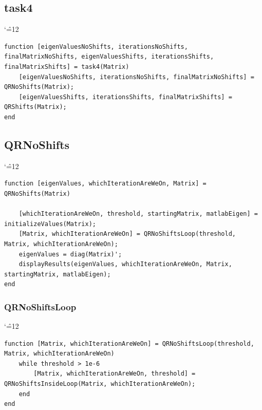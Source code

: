 \documentclass[12pt]{report}
\newenvironment{simplechar}{%
   \catcode`\^=12
}{}
\begin{document}
\subsection{task4}
\begin{simplechar}
\begin{lstlisting}
function [eigenValuesNoShifts, iterationsNoShifts, finalMatrixNoShifts, eigenValuesShifts, iterationsShifts, finalMatrixShifts] = task4(Matrix)
    [eigenValuesNoShifts, iterationsNoShifts, finalMatrixNoShifts] = QRNoShifts(Matrix);
    [eigenValuesShifts, iterationsShifts, finalMatrixShifts] = QRShifts(Matrix);
end
\end{lstlisting}
\end{simplechar}

\subsection{QRNoShifts}
\begin{simplechar}
\begin{lstlisting}
function [eigenValues, whichIterationAreWeOn, Matrix] = QRNoShifts(Matrix)

    [whichIterationAreWeOn, threshold, startingMatrix, matlabEigen] = initializeValues(Matrix);
    [Matrix, whichIterationAreWeOn] = QRNoShiftsLoop(threshold, Matrix, whichIterationAreWeOn);
    eigenValues = diag(Matrix)';
    displayResults(eigenValues, whichIterationAreWeOn, Matrix, startingMatrix, matlabEigen);
end
\end{lstlisting}
\end{simplechar}

\newpage
\subsubsection{QRNoShiftsLoop}
\begin{simplechar}
\begin{lstlisting}
function [Matrix, whichIterationAreWeOn] = QRNoShiftsLoop(threshold, Matrix, whichIterationAreWeOn)
    while threshold > 1e-6
        [Matrix, whichIterationAreWeOn, threshold] = QRNoShiftsInsideLoop(Matrix, whichIterationAreWeOn);
    end
end
\end{lstlisting}
\end{simplechar}
\end{document}
